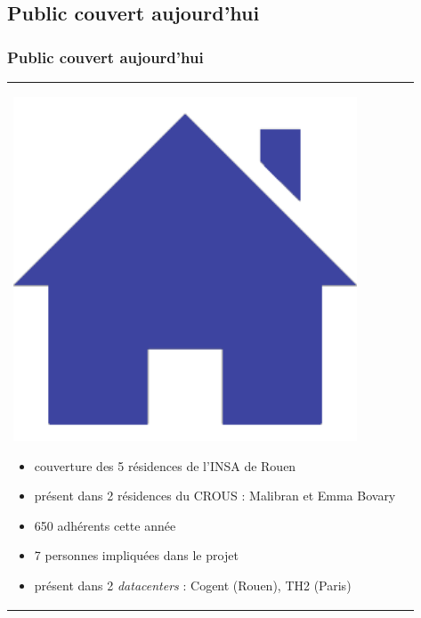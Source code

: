 \documentclass[handout]{beamer}
\begin{document}
	\subsection{Public couvert aujourd'hui}
		\begin{frame}
		\frametitle{Public couvert aujourd'hui}
		\begin{tabular}{l l}
			\begin{minipage}{0.2\textwidth}
				\begin{center}
					\includegraphics[width=0.9\textwidth]{images/residence.png}
				\end{center}
			\end{minipage}

			\begin{minipage}{0.8\textwidth}
				\begin{itemize}
					\item couverture des 5 résidences de l'INSA de Rouen
					\item présent dans 2 résidences du CROUS : Malibran et Emma Bovary
					\item 650 adhérents cette année
					\item 7 personnes impliquées dans le projet
					\item présent dans 2 \textit{datacenters} : Cogent (Rouen), TH2 (Paris)
				\end{itemize}
			\end{minipage}
			
		\end{tabular}
		\end{frame}
\end{document}

